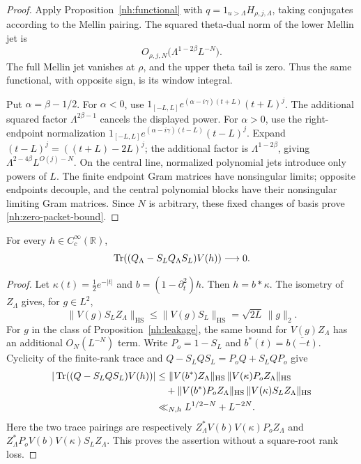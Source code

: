 \begin{proof}
Apply Proposition~\ref{nh:functional} with
$q=1_{u>\Lambda}H_{\rho,j,\Lambda}$, taking conjugates
according to the Mellin pairing. The squared theta-dual norm
of the lower Mellin jet is
\[
 O_{\rho,j,N}\bigl(\Lambda^{1-2\beta}L^{-N}\bigr).
\]
The full Mellin jet vanishes at $\rho$, and the upper theta
tail is zero. Thus the same functional, with opposite sign,
is its window integral.

Put $\alpha=\beta-1/2$. For $\alpha<0$, use
$1_{[-L,L]}e^{(\alpha-i\gamma)(t+L)}(t+L)^j$.
The additional squared factor $\Lambda^{2\beta-1}$
cancels the displayed power. For $\alpha>0$, use the
right-endpoint normalization
$1_{[-L,L]}e^{(\alpha-i\gamma)(t-L)}(t-L)^j$.
Expand $(t-L)^j=((t+L)-2L)^j$; the additional factor is
$\Lambda^{1-2\beta}$, giving
$\Lambda^{2-4\beta}L^{O(j)-N}$.
On the central line, normalized polynomial jets introduce
only powers of $L$.
The finite endpoint Gram matrices have nonsingular limits;
opposite endpoints decouple, and the central polynomial blocks
have their nonsingular limiting Gram matrices.
Since $N$ is arbitrary, these fixed changes of basis prove
\eqref{nh:zero-packet-bound}.
\end{proof}

\begin{proposition}
\label{nh:trace-transfer}
For every $h\in C_c^\infty(\mathbb R)$,
\[
 \operatorname{Tr}((Q_\Lambda-S_LQ_\Lambda S_L)V(h))\longrightarrow0.
\]
\end{proposition}

\begin{proof}
Let $\kappa(t)=\tfrac12e^{-|t|}$ and
$b=(1-\partial_t^2)h$. Then $h=b*\kappa$.
The isometry of $Z_\Lambda$ gives, for $g\in L^2$,
\[
 \|V(g)S_LZ_\Lambda\|_{\mathrm{HS}}
 \leq\|V(g)S_L\|_{\mathrm{HS}}
                         =\sqrt{2L}\,\|g\|_2.
\]
For $g$ in the class of Proposition~\ref{nh:leakage},
the same bound for $V(g)Z_\Lambda$ has an additional
$O_N(L^{-N})$ term.
Write $P_o=1-S_L$ and $b^*(t)=\overline{b(-t)}$.
Cyclicity of the finite-rank trace and
$Q-S_LQS_L=P_oQ+S_LQP_o$ give
\begin{align*}
 |\operatorname{Tr}((Q-S_LQS_L)V(h))|
 &\leq\|V(b^*)Z_\Lambda\|_{\mathrm{HS}}\,
                  \|V(\kappa)P_oZ_\Lambda\|_{\mathrm{HS}}\\
 &\quad+\|V(b^*)P_oZ_\Lambda\|_{\mathrm{HS}}\,
                  \|V(\kappa)S_LZ_\Lambda\|_{\mathrm{HS}}\\
 &\ll_{N,h}L^{1/2-N}+L^{-2N}.
\end{align*}
Here the two trace pairings are respectively
$Z_\Lambda^*V(b)V(\kappa)P_oZ_\Lambda$ and
$Z_\Lambda^*P_oV(b)V(\kappa)S_LZ_\Lambda$.
This proves the assertion without a square-root rank loss.
\end{proof}

